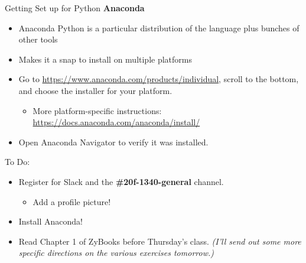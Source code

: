 \documentclass[
  11pt,
  ignorenonframetext,
]{beamer}
\providecommand{\tightlist}{%
  \setlength{\itemsep}{0pt}\setlength{\parskip}{0pt}}
\begin{document}
\begin{frame}{Getting Set up for Python}
\protect\hypertarget{getting-set-up-for-python}{}
\textbf{Anaconda}

\begin{itemize}
\item
  Anaconda Python is a particular distribution of the language plus
  bunches of other tools
\item
  Makes it a snap to install on multiple platforms
\item
  Go to \url{https://www.anaconda.com/products/individual}, scroll to
  the bottom, and choose the installer for your platform.

  \begin{itemize}
  \tightlist
  \item
    More platform-specific instructions:
    \url{https://docs.anaconda.com/anaconda/install/}
  \end{itemize}
\item
  Open Anaconda Navigator to verify it was installed.
\end{itemize}
\end{frame}

\begin{frame}{To Do:}
\protect\hypertarget{to-do}{}
\begin{itemize}
\tightlist
\item
  Register for Slack and the \textbf{\#20f-1340-general} channel.

  \begin{itemize}
  \tightlist
  \item
    Add a profile picture!
  \end{itemize}
\item
  Install Anaconda!
\item
  Read Chapter 1 of ZyBooks before Thursday's class. \emph{(I'll send
  out some more specific directions on the various exercises tomorrow.)}
\end{itemize}
\end{frame}
\end{document}
